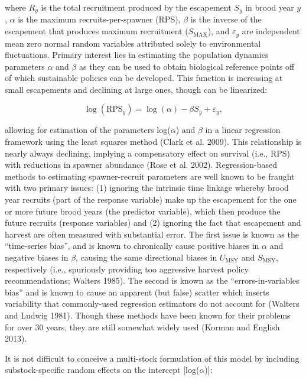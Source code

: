 \documentclass[12pt,]{book}
\theoremstyle{definition}
\theoremstyle{definition}
\theoremstyle{definition}
\theoremstyle{remark}
\begin{document}
\noindent
where \(R_y\) is the total recruitment produced by the escapement
\(S_y\) in brood year \(y\), \(\alpha\) is the maximum
recruits-per-spawner (RPS), \(\beta\) is the inverse of the escapement
that produces maximum recruitment (\(S_{\text{MAX}}\)), and
\(\varepsilon_y\) are independent mean zero normal random variables
attributed solely to environmental fluctuations. Primary interest lies
in estimating the population dynamics parameters \(\alpha\) and
\(\beta\) as they can be used to obtain biological reference points off
of which sustainable policies can be developed. This function is
increasing at small escapements and declining at large ones, though can
be linearized:

\begin{equation}
  \log(\text{RPS}_y)=\log(\alpha)-\beta S_y + \varepsilon_y,
  \label{eq:lin-ricker-fixed}
\end{equation}

\noindent
allowing for estimation of the parameters log(\(\alpha\)) and \(\beta\)
in a linear regression framework using the least squares method (Clark
et al. 2009). This relationship is nearly always declining, implying a
compensatory effect on survival (i.e., RPS) with reductions in spawner
abundance (Rose et al. 2002). Regression-based methods to estimating
spawner-recruit parameters are well known to be fraught with two primary
issues: (1) ignoring the intrinsic time linkage whereby brood year
recruits (part of the response variable) make up the escapement for the
one or more future brood years (the predictor variable), which then
produce the future recruits (response variables) and (2) ignoring the
fact that escapement and harvest are often measured with substantial
error. The first issue is known as the ``time-series bias'', and is
known to chronically cause positive biases in \(\alpha\) and negative
biases in \(\beta\), causing the same directional biases in
\(U_{\text{MSY}}\) and \(S_{\text{MSY}}\), respectively (i.e.,
spuriously providing too aggressive harvest policy recommendations;
Walters 1985). The second is known as the ``errors-in-variables bias''
and is known to cause an apparent (but false) scatter which inserts
variability that commonly-used regression estimators do not account for
(Walters and Ludwig 1981). Though these methods have been known for
their problems for over 30 years, they are still somewhat widely used
(Korman and English 2013).

It is not difficult to conceive a multi-stock formulation of this model
by including substock-specific random effects on the intercept
{[}log(\(\alpha\)){]}:
\end{document}

